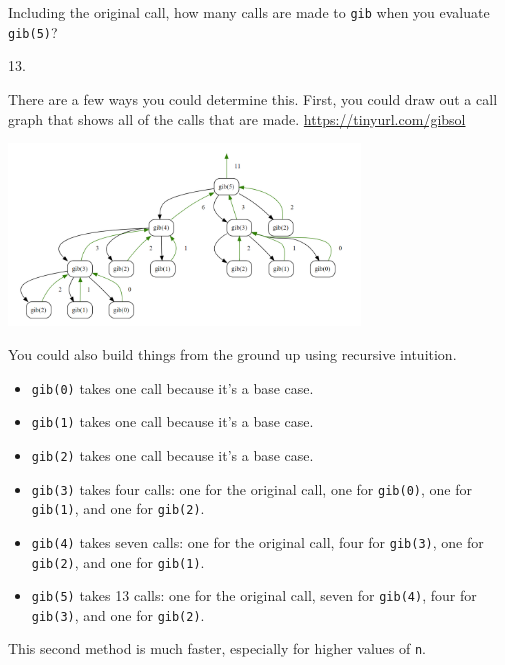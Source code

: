 \begin{blocksection}
\question Including the original call, how many calls are made to \lstinline{gib} when you evaluate \lstinline{gib(5)}?

\begin{solution}[3.5in]
13. 

There are a few ways you could determine this. First, you could draw out a call graph that shows all of the calls that are made. 
\url{https://tinyurl.com/gibsol}

\includegraphics[width=0.7\textwidth]{gibonacci.png}

You could also build things from the ground up using recursive intuition. 
\begin{itemize}
    \item \lstinline{gib(0)} takes one call because it's a base case. 
    \item \lstinline{gib(1)} takes one call because it's a base case. 
    \item \lstinline{gib(2)} takes one call because it's a base case. 
    \item \lstinline{gib(3)} takes four calls: one for the original call, one for \lstinline{gib(0)}, one for \lstinline{gib(1)}, and one for \lstinline{gib(2)}. 
    \item \lstinline{gib(4)} takes seven calls: one for the original call, four for \lstinline{gib(3)}, one for \lstinline{gib(2)}, and one for \lstinline{gib(1)}. 
    \item \lstinline{gib(5)} takes 13 calls: one for the original call, seven for \lstinline{gib(4)}, four for \lstinline{gib(3)}, and one for \lstinline{gib(2)}. 
\end{itemize}
This second method is much faster, especially for higher values of \lstinline{n}. 
\end{solution}
\end{blocksection}

